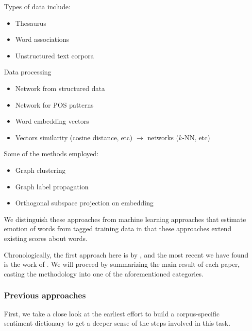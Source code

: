 {\noindent Types of data include:
\begin{itemize}
\item Thesaurus\vspace{-12pt}
\item Word associations\vspace{-12pt}
\item Unstructured text corpora
\end{itemize}
\noindent Data processing
\begin{itemize}
\item Network from structured data\vspace{-12pt}
\item Network for POS patterns\vspace{-12pt}
\item Word embedding vectors\vspace{-12pt}
\item Vectors similarity (cosine distance, etc) $\rightarrow$ networks ($k$-NN, etc)
\end{itemize}
\noindent Some of the methods employed:
\begin{itemize}
\item Graph clustering\vspace{-12pt}
\item Graph label propagation\vspace{-12pt}
\item Orthogonal subspace projection on embedding
\end{itemize}
We distinguish these approaches from machine learning approaches that estimate emotion of words from tagged training data in that these approaches extend existing scores about words.

Chronologically, the first approach here is by \cite{hatzivassiloglou1997predicting}, and the most recent we have found is the work of \cite{rothe2016ultradense}.
We will proceed by summarizing the main result of each paper, casting the methodology into one of the aforementioned categories.

\subsubsection{Previous approaches}
\label{subsec:prev-propagation}

First, we take a close look at the earliest effort to build a corpus-specific sentiment dictionary to get a deeper sense of the steps involved in this task.\\

}
